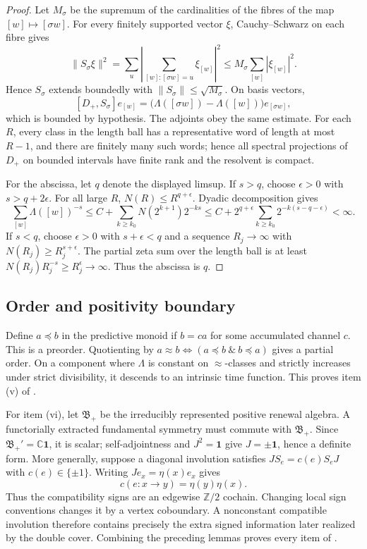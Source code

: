 \documentclass[11pt]{article}
\theoremstyle{definition}
\theoremstyle{remark}
\newcommand{\C}{\mathbb C}
\newcommand{\one}{\mathbf 1}
\newcommand{\Ztwo}{\mathbb Z/2}
\begin{document}
\begin{proof}
Let $M_\sigma$ be the supremum of the cardinalities of the fibres of the
map $[w]\mapsto[\sigma w]$.  For every finitely supported vector $\xi$,
Cauchy--Schwarz on each fibre gives
\[
 \|S_\sigma\xi\|^2
 =\sum_u\left|\sum_{[w]:[\sigma w]=u}\xi_{[w]}\right|^2
 \le M_\sigma\sum_{[w]}|\xi_{[w]}|^2.
\]
Hence $S_\sigma$ extends boundedly with
$\|S_\sigma\|\le\sqrt{M_\sigma}$.  On basis vectors,
\[
 [D_+,S_\sigma]e_{[w]}
 =\bigl(\Lambda([\sigma w])-\Lambda([w])\bigr)e_{[\sigma w]},
\]
which is bounded by hypothesis.  The adjoints obey the same estimate.
For each $R$, every class in the length ball has a representative word of
length at most $R-1$, and there are finitely many such words; hence all spectral
projections of $D_+$ on bounded intervals have finite rank and the resolvent is
compact.

For the abscissa, let $q$ denote the displayed limsup.  If $s>q$, choose
$\epsilon>0$ with $s>q+2\epsilon$.  For all large $R$,
$N(R)\le R^{q+\epsilon}$.  Dyadic decomposition gives
\[
 \sum_{[w]}\Lambda([w])^{-s}
 \le C+\sum_{k\ge k_0}N(2^{k+1})2^{-ks}
 \le C+2^{q+\epsilon}\sum_{k\ge k_0}
 2^{-k(s-q-\epsilon)}<\infty.
\]
If $s<q$, choose $\epsilon>0$ with $s+\epsilon<q$ and a sequence $R_j\to\infty$
with $N(R_j)\ge R_j^{s+\epsilon}$.  The partial zeta sum over the length ball is
at least $N(R_j)R_j^{-s}\ge R_j^\epsilon\to\infty$.  Thus the abscissa is $q$.
\end{proof}

\subsection{Order and positivity boundary}

Define $a\preceq b$ in the predictive monoid if $b=ca$ for some accumulated
channel $c$.  This is a preorder.  Quotienting by
$a\approx b\Longleftrightarrow(a\preceq b\ \&\ b\preceq a)$ gives a partial
order.  On a component where $\Lambda$ is constant on $\approx$-classes and
strictly increases under strict divisibility, it descends to an intrinsic time
function.  This proves item \textup{(v)} of .

For item \textup{(vi)}, let $\mathfrak B_+$ be the irreducibly represented
positive renewal algebra.  A functorially extracted fundamental symmetry must
commute with $\mathfrak B_+$.  Since $\mathfrak B_+'=\C\one$, it is scalar;
self-adjointness and $J^2=\one$ give $J=\pm\one$, hence a definite form.
More generally, suppose a diagonal involution satisfies
$JS_e=c(e)S_eJ$ with $c(e)\in\{\pm1\}$.  Writing $Je_x=\eta(x)e_x$ gives
\[
  c(e:x\to y)=\eta(y)\eta(x).
\]
Thus the compatibility signs are an edgewise $\Ztwo$ cochain.  Changing local
sign conventions changes it by a vertex coboundary.  A nonconstant compatible
involution therefore contains precisely the extra signed information later
realized by the double cover.  Combining the preceding lemmas proves every item
of .
\end{document}
